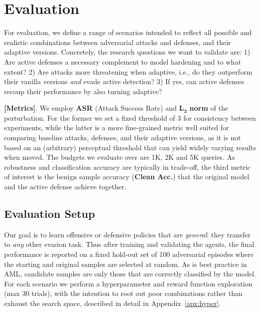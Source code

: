 \section{Evaluation}
\label{sec:evaluation}
For evaluation, we define a range of scenarios intended to reflect all possible and realistic combinations between adversarial attacks and defenses, and their adaptive versions.
Concretely, the research questions we want to validate are: 1) Are active defenses a necessary complement to model hardening and to what extent? 2) Are attacks more threatening when adaptive, i.e., do they outperform their vanilla versions \textit{and} evade active detection? 3) If yes, can active defenses recoup their performance by also turning adaptive?

\textbf{[Metrics]}. We employ \textbf{ASR} (Attack Success Rate) and $\mathbf{L_2}$ \textbf{norm} of the perturbation.
For the former we set a fixed threshold of 3 for consistency between experiments, while the latter is a more fine-grained metric well suited for comparing baseline attacks, defenses, and their adaptive versions, as it is not based on an (arbitrary) perceptual threshold that can yield widely varying results when moved.
The budgets we evaluate over are 1K, 2K and 5K queries.
As robustness and classification accuracy are typically in trade-off, the third metric of interest is the benign sample accuracy (\textbf{Clean Acc.}) that the original model and the active defense achieve together.

\subsection{Evaluation Setup}
Our goal is to learn offensive or defensive policies that are \emph{general}: they transfer to \textit{any} other evasion task.
Thus after training and validating the agents, the final performance is reported on a fixed hold-out set of 100 adversarial episodes where the starting and original samples are selected at random.
As is best practice in \gls{AML}, candidate samples are only those that are correctly classified by the model.
For each scenario we perform a hyperparameter and reward function exploration (max 30 trials), with the intention to root out poor combinations rather than exhaust the search space, described in detail in Appendix~\ref{apx:hyper}.

